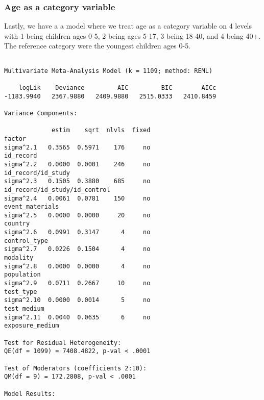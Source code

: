 \documentclass[
  letterpaper,
  DIV=11,
  numbers=noendperiod]{scrartcl}
\begin{document}
\hypertarget{age-as-a-category-variable}{%
\subsubsection{Age as a category
variable}\label{age-as-a-category-variable}}

Lastly, we have a a model where we treat age as a category variable on 4
levels with 1 being children ages 0-5, 2 being ages 5-17, 3 being 18-40,
and 4 being 40+. The reference category were the youngest children ages
0-5.

\begin{verbatim}

Multivariate Meta-Analysis Model (k = 1109; method: REML)

    logLik    Deviance         AIC         BIC        AICc   
-1183.9940   2367.9880   2409.9880   2515.0333   2410.8459   

Variance Components:

             estim    sqrt  nlvls  fixed                         factor 
sigma^2.1   0.3565  0.5971    176     no                      id_record 
sigma^2.2   0.0000  0.0001    246     no             id_record/id_study 
sigma^2.3   0.1505  0.3880    685     no  id_record/id_study/id_control 
sigma^2.4   0.0061  0.0781    150     no                event_materials 
sigma^2.5   0.0000  0.0000     20     no                        country 
sigma^2.6   0.0991  0.3147      4     no                   control_type 
sigma^2.7   0.0226  0.1504      4     no                       modality 
sigma^2.8   0.0000  0.0000      4     no                     population 
sigma^2.9   0.0711  0.2667     10     no                      test_type 
sigma^2.10  0.0000  0.0014      5     no                    test_medium 
sigma^2.11  0.0040  0.0635      6     no                exposure_medium 

Test for Residual Heterogeneity:
QE(df = 1099) = 7408.4822, p-val < .0001

Test of Moderators (coefficients 2:10):
QM(df = 9) = 172.2808, p-val < .0001

Model Results:


\end{verbatim}
\end{document}
